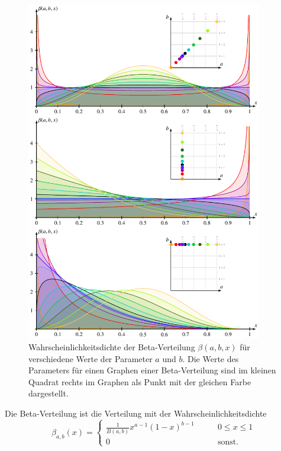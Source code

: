 \begin{figure}
\centering
\includegraphics[width=0.92\textwidth]{chapters/040-rekursion/images/beta.pdf}
\caption{Wahrscheinlichkeitsdichte der Beta-Verteilung
$\beta(a,b,x)$
für verschiedene Werte der Parameter $a$ und $b$.
Die Werte des Parameters für einen Graphen einer Beta-Verteilung
sind im kleinen Quadrat rechts im Graphen
als Punkt mit der gleichen Farbe dargestellt.
\label{buch:rekursion:ordnung:fig:betaverteilungn}}
\end{figure}

\begin{definition}
Die Beta-Verteilung ist die Verteilung mit der Wahrscheinlichkeitsdichte
\[
\beta_{a,b}(x)
=
\begin{cases}
\displaystyle
\frac{1}{B(a,b)}
x^{a-1}(1-x)^{b-1}&\qquad 0\le x \le 1\\
0&\qquad\text{sonst.}
\end{cases}
\]
\end{definition}

